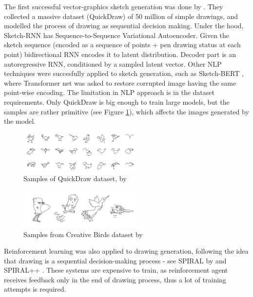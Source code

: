 \documentclass{article}
\begin{document}
The first successful vector-graphics sketch generation was done by \cite{sketchrnn}. They collected a massive dataset (QuickDraw) of 50 million of simple drawings, and modelled the process of drawing as sequential decision making. Under the hood, Sketch-RNN has Sequence-to-Sequence Variational Autoencoder. Given the sketch sequence (encoded as a sequence of points + pen drawing status at each point) bidirectional RNN encodes it to latent distribution. Decoder part is an autoregressive RNN, conditioned by a sampled latent vector. Other NLP techniques were succesfully applied to sketch generation, such as Sketch-BERT \cite{sketchbert}, where Transformer net was asked to restore corrupted image having the same point-wise encoding. The limitation in NLP approach is in the dataset requirements. Only QuickDraw is big enough to train large models, but the samples are rather primitive (see Figure \ref{fig:quickdraw}), which affects the images generated by the model.

\begin{figure}[h]
	\centering
	\includegraphics[width=0.55\textwidth]{img/quickdraw.png}
	\caption{Samples of QuickDraw dataset, by \cite{sketchrnn}}
	\label{fig:quickdraw}
\end{figure}

\begin{figure}[h]
	\centering
	\includegraphics[width=0.55\textwidth]{img/doodlergan1.png}
	\caption{Samples from Creative Birds dataset by \cite{doodlergan}}
	\label{fig:doodlergan}
\end{figure}

Reinforcement learning was also applied to drawing generation, following the idea that drawing is a sequential decision-making process - see SPIRAL by \cite{ganin2018synthesizing} and SPIRAL++ \cite{mellor2019unsupervised}. These systems are expensive to train, as reinforcement agent receives feedback only in the end of drawing process, thus a lot of training attempts is required. 
\end{document}
